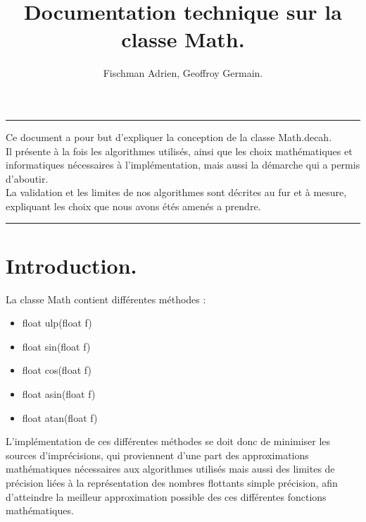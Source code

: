 \documentclass[a4,12pt]{article}
\begin{document}
\begin{titlepage}
\title{ Documentation technique sur la classe Math.}
\author{Fischman Adrien, Geoffroy Germain.}
\date{}

\maketitle

\rule[0.5ex]{\textwidth}{0.2mm}
Ce document a pour but d'expliquer la conception de la classe Math.decah.\\
Il présente à la fois les algorithmes utilisés, ainsi que les choix mathématiques et informatiques nécessaires à l'implémentation, mais aussi la démarche qui a permis d'aboutir.\\
La validation et les limites de nos algorithmes sont décrites au fur et à mesure, expliquant les choix que nous avons étés amenés a prendre.

\rule[0.5ex]{\textwidth}{0.2mm}

\end{titlepage}
\tableofcontents
\newpage
\section{Introduction.}
La classe Math contient différentes méthodes :
\begin{itemize}
    \item float ulp(float f)
    \item float sin(float f)
    \item float cos(float f)
    \item float asin(float f)
    \item float atan(float f)
\end{itemize}
L'implémentation de ces différentes méthodes se doit donc de minimiser les sources d'imprécisions, qui proviennent d'une part des approximations mathématiques nécessaires aux algorithmes utilisés mais aussi des limites de précision liées à la représentation des nombres flottants simple précision, afin d'atteindre la meilleur approximation possible des ces différentes fonctions mathématiques.
\end{document}
